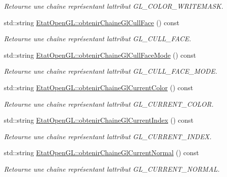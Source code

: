 \begin{DoxyCompactItemize}
\begin{DoxyCompactList}\small\item\em Retourne une chaîne représentant l\textquotesingle{}attribut G\+L\+\_\+\+C\+O\+L\+O\+R\+\_\+\+W\+R\+I\+T\+E\+M\+A\+S\+K. \end{DoxyCompactList}\item 
std\+::string \hyperlink{group__utilitaire_ga6c53044cfb9b67582efe6415ff1f1f49}{Etat\+Open\+G\+L\+::obtenir\+Chaine\+Gl\+Cull\+Face} () const 
\begin{DoxyCompactList}\small\item\em Retourne une chaîne représentant l\textquotesingle{}attribut G\+L\+\_\+\+C\+U\+L\+L\+\_\+\+F\+A\+C\+E. \end{DoxyCompactList}\item 
std\+::string \hyperlink{group__utilitaire_ga0601a9f84791de8e9ab33841308ecea0}{Etat\+Open\+G\+L\+::obtenir\+Chaine\+Gl\+Cull\+Face\+Mode} () const 
\begin{DoxyCompactList}\small\item\em Retourne une chaîne représentant l\textquotesingle{}attribut G\+L\+\_\+\+C\+U\+L\+L\+\_\+\+F\+A\+C\+E\+\_\+\+M\+O\+D\+E. \end{DoxyCompactList}\item 
std\+::string \hyperlink{group__utilitaire_gabe349174d65850291bc46f7b524dac44}{Etat\+Open\+G\+L\+::obtenir\+Chaine\+Gl\+Current\+Color} () const 
\begin{DoxyCompactList}\small\item\em Retourne une chaîne représentant l\textquotesingle{}attribut G\+L\+\_\+\+C\+U\+R\+R\+E\+N\+T\+\_\+\+C\+O\+L\+O\+R. \end{DoxyCompactList}\item 
std\+::string \hyperlink{group__utilitaire_ga222790a07e4a9cacfbe2f68cd97fd8d9}{Etat\+Open\+G\+L\+::obtenir\+Chaine\+Gl\+Current\+Index} () const 
\begin{DoxyCompactList}\small\item\em Retourne une chaîne représentant l\textquotesingle{}attribut G\+L\+\_\+\+C\+U\+R\+R\+E\+N\+T\+\_\+\+I\+N\+D\+E\+X. \end{DoxyCompactList}\item 
std\+::string \hyperlink{group__utilitaire_gac6c54789d936998634ad29c80e150d92}{Etat\+Open\+G\+L\+::obtenir\+Chaine\+Gl\+Current\+Normal} () const 
\begin{DoxyCompactList}\small\item\em Retourne une chaîne représentant l\textquotesingle{}attribut G\+L\+\_\+\+C\+U\+R\+R\+E\+N\+T\+\_\+\+N\+O\+R\+M\+A\+L. \end{DoxyCompactList}\item 

\end{DoxyCompactItemize}
